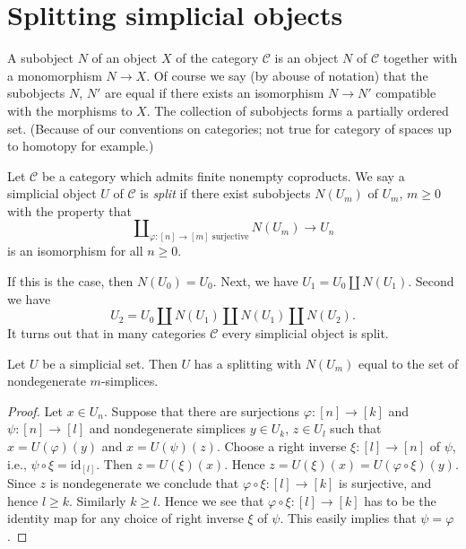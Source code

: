 \section{Splitting simplicial objects}
\label{section-splitting}

\noindent
A subobject $N$ of an object $X$ of the category $\mathcal{C}$
is an object $N$ of $\mathcal{C}$ together with a monomorphism
$N \to X$. Of course we say (by abouse of notation) that
the subobjects $N$, $N'$ are equal if there exists an isomorphism
$N \to N'$ compatible with the morphisms to $X$. The collection
of subobjects forms a partially ordered set. (Because of our
conventions on categories; not true for category of spaces
up to homotopy for example.)

\begin{definition}
\label{definition-split}
Let $\mathcal{C}$ be a category which admits finite nonempty coproducts.
We say a simplicial object $U$ of $\mathcal{C}$ is {\it split}
if there exist subobjects $N(U_m)$ of $U_m$, $m \geq 0$
with the property that
\begin{equation}
\label{equation-splitting}
\coprod\nolimits_{\varphi : [n] \to [m]\text{ surjective}}
N(U_m)
\longrightarrow
U_n
\end{equation}
is an isomorphism for all $n \geq 0$.
\end{definition}

\noindent
If this is the case, then $N(U_0) = U_0$. Next, we have
$U_1 = U_0 \coprod N(U_1)$. Second we have
$$
U_2 = U_0 \coprod N(U_1) \coprod N(U_1) \coprod N(U_2).
$$
It turns out that in many categories $\mathcal{C}$
every simplicial object is split.

\begin{lemma}
\label{lemma-splitting-simplicial-sets}
Let $U$ be a simplicial set.
Then $U$ has a splitting
with $N(U_m)$ equal to the set of
nondegenerate $m$-simplices.
\end{lemma}

\begin{proof}
Let $x \in U_n$. Suppose that
there are surjections $\varphi : [n] \to [k]$
and $\psi : [n] \to [l]$ and nondegenerate simplices
$y \in U_k$, $z \in U_l$ such that $x = U(\varphi)(y)$
and $x = U(\psi)(z)$. Choose a right inverse $\xi : [l] \to [n]$
of $\psi$, i.e., $\psi \circ \xi = \text{id}_{[l]}$.
Then $z = U(\xi)(x)$. Hence $z = U(\xi)(x) = U(\varphi \circ \xi)(y)$.
Since $z$ is nondegenerate we conclude that $\varphi \circ \xi :
[l] \to [k]$ is surjective, and hence $l \geq k$. Similarly
$k \geq l$. Hence we see that $\varphi \circ \xi : [l] \to [k]$
has to be the identity map for any choice of right inverse
$\xi$ of $\psi$. This easily implies that $\psi = \varphi$.
\end{proof}

